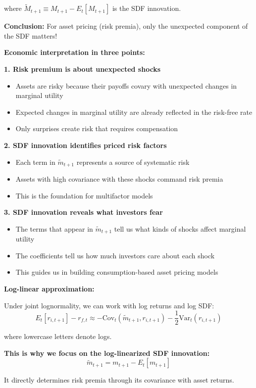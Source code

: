 \documentclass{beamer}
\begin{document}
\begin{frame}[allowframebreaks]
    where $\tilde{M}_{t+1} \equiv M_{t+1} - E_t[M_{t+1}]$ is the SDF innovation.
    
    \textbf{Conclusion:} For asset pricing (risk premia), only the unexpected component of the SDF matters!
    
    \framebreak
    
    \textbf{Economic interpretation in three points:}
    
    \textbf{1. Risk premium is about unexpected shocks}
    \begin{itemize}
        \item Assets are risky because their payoffs covary with unexpected changes in marginal utility
        \item Expected changes in marginal utility are already reflected in the risk-free rate
        \item Only surprises create risk that requires compensation
    \end{itemize}
    
    \textbf{2. SDF innovation identifies priced risk factors}
    \begin{itemize}
        \item Each term in $\tilde{m}_{t+1}$ represents a source of systematic risk
        \item Assets with high covariance with these shocks command risk premia
        \item This is the foundation for multifactor models
    \end{itemize}
    
    \framebreak
    
    \textbf{3. SDF innovation reveals what investors fear}
    \begin{itemize}
        \item The terms that appear in $\tilde{m}_{t+1}$ tell us what kinds of shocks affect marginal utility
        \item The coefficients tell us how much investors care about each shock
        \item This guides us in building consumption-based asset pricing models
    \end{itemize}
    
    \framebreak
    
    \textbf{Log-linear approximation:}
    
    Under joint lognormality, we can work with log returns and log SDF:
    \begin{equation*}
        E_t[r_{i,t+1}] - r_{f,t} \approx -\text{Cov}_t(\tilde{m}_{t+1}, r_{i,t+1}) - \frac{1}{2}\text{Var}_t(r_{i,t+1})
    \end{equation*}
    
    where lowercase letters denote logs.
    
    \textbf{This is why we focus on the log-linearized SDF innovation:}
    \begin{equation*}
        \tilde{m}_{t+1} = m_{t+1} - E_t[m_{t+1}]
    \end{equation*}
    
    It directly determines risk premia through its covariance with asset returns.
\end{frame}
\end{document}
